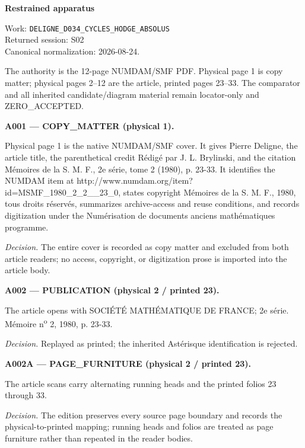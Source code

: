 \documentclass[10pt,a4paper]{article}
\begin{document}
\fontsize{9.2}{11.2}\selectfont
\sloppy
\begin{center}{\Large\bfseries Restrained apparatus}\end{center}

\noindent Work: \texttt{DELIGNE\_D034\_CYCLES\_HODGE\_ABSOLUS}\\ Returned session: S02\\ Canonical normalization: 2026-08-24.

\medskip

The authority is the 12-page NUMDAM/SMF PDF. Physical page 1 is copy matter; physical pages 2--12 are the article, printed pages 23--33. The comparator and all inherited candidate/diagram material remain locator-only and ZERO\_ACCEPTED.

\medskip

\noindent\textbf{A001 --- COPY\_MATTER (physical 1).}

Physical page 1 is the native NUMDAM/SMF cover. It gives Pierre Deligne, the article title, the parenthetical credit Rédigé par J. L. Brylinski, and the citation Mémoires de la S. M. F., 2e série, tome 2 (1980), p. 23-33. It identifies the NUMDAM item at http://www.numdam.org/item?id=MSMF\_1980\_2\_2\_\_23\_0, states copyright Mémoires de la S. M. F., 1980, tous droits réservés, summarizes archive-access and reuse conditions, and records digitization under the Numérisation de documents anciens mathématiques programme.

\par\textit{Decision.} The entire cover is recorded as copy matter and excluded from both article readers; no access, copyright, or digitization prose is imported into the article body.

\medskip

\noindent\textbf{A002 --- PUBLICATION (physical 2 / printed 23).}

The article opens with SOCIÉTÉ MATHÉMATIQUE DE FRANCE; 2e série. Mémoire n\textsuperscript{o} 2, 1980, p. 23-33.

\par\textit{Decision.} Replayed as printed; the inherited Astérisque identification is rejected.

\medskip

\noindent\textbf{A002A --- PAGE\_FURNITURE (physical 2 / printed 23).}

The article scans carry alternating running heads and the printed folios 23 through 33.

\par\textit{Decision.} The edition preserves every source page boundary and records the physical-to-printed mapping; running heads and folios are treated as page furniture rather than repeated in the reader bodies.
\end{document}

